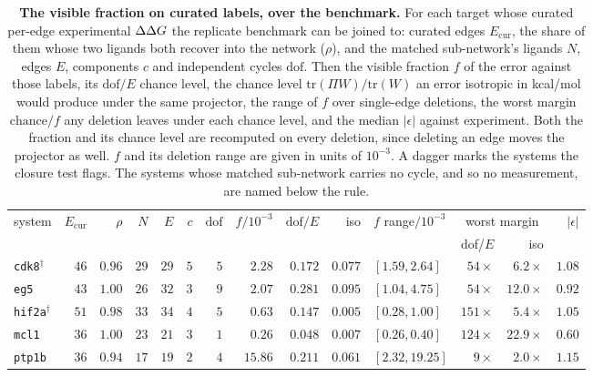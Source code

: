 \begin{table}[tp]\centering
\caption{\textbf{The visible fraction on curated labels, over the benchmark.} For each target whose curated per-edge experimental $\Delta\Delta G$ the replicate benchmark can be joined to: curated edges $E_{\mathrm{cur}}$, the share of them whose two ligands both recover into the network ($\rho$), and the matched sub-network's ligands $N$, edges $E$, components $c$ and independent cycles $\mathrm{dof}$. Then the visible fraction $f$ of the error against those labels, its $\mathrm{dof}/E$ chance level, the chance level $\mathrm{tr}(\Pi W)/\mathrm{tr}(W)$ an error isotropic in kcal/mol would produce under the same projector, the range of $f$ over single-edge deletions, the worst margin $\mathrm{chance}/f$ any deletion leaves under each chance level, and the median $|\epsilon|$ against experiment. Both the fraction and its chance level are recomputed on every deletion, since deleting an edge moves the projector as well. $f$ and its deletion range are given in units of $10^{-3}$. A dagger marks the systems the closure test flags. The systems whose matched sub-network carries no cycle, and so no measurement, are named below the rule.}
\label{tab:ground}
\footnotesize
\setlength{\tabcolsep}{3.4pt}
\begin{tabular}{@{}lrrrrrrrrrlrrr@{}}
\toprule
system & $E_{\mathrm{cur}}$ & $\rho$ & $N$ & $E$ & $c$ & $\mathrm{dof}$ & $f/10^{-3}$ & $\mathrm{dof}/E$ & iso & $f$ range$/10^{-3}$ & \multicolumn{2}{c}{worst margin} & $|\epsilon|$ \\
 &  &  &  &  &  &  &  &  &  &  & dof/$E$ & iso &  \\
\midrule
\texttt{cdk8}$^\dagger$ & $46$ & $0.96$ & $29$ & $29$ & $5$ & $5$ & $2.28$ & $0.172$ & $0.077$ & $[1.59, 2.64]$ & $54\times$ & $6.2\times$ & $1.08$ \\
\texttt{eg5} & $43$ & $1.00$ & $26$ & $32$ & $3$ & $9$ & $2.07$ & $0.281$ & $0.095$ & $[1.04, 4.75]$ & $54\times$ & $12.0\times$ & $0.92$ \\
\texttt{hif2a}$^\dagger$ & $51$ & $0.98$ & $33$ & $34$ & $4$ & $5$ & $0.63$ & $0.147$ & $0.005$ & $[0.28, 1.00]$ & $151\times$ & $5.4\times$ & $1.05$ \\
\texttt{mcl1} & $36$ & $1.00$ & $23$ & $21$ & $3$ & $1$ & $0.26$ & $0.048$ & $0.007$ & $[0.26, 0.40]$ & $124\times$ & $22.9\times$ & $0.60$ \\
\texttt{ptp1b} & $36$ & $0.94$ & $17$ & $19$ & $2$ & $4$ & $15.86$ & $0.211$ & $0.061$ & $[2.32, 19.25]$ & $9\times$ & $2.0\times$ & $1.15$ \\

\end{tabular}
\end{table}
